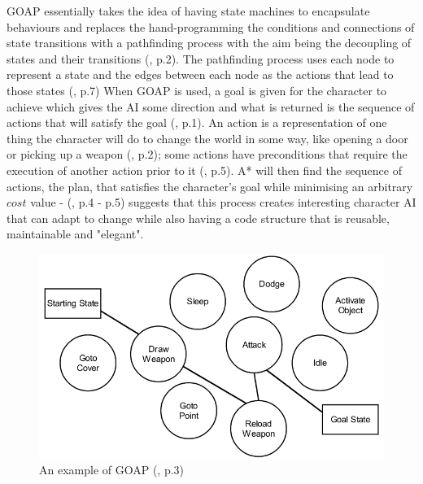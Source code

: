 \documentclass[10pt]{article}
\begin{document}
GOAP essentially takes the idea of having state machines to encapsulate behaviours and replaces the hand-programming the conditions and connections of state transitions with a pathfinding process with the aim being the decoupling of states and their transitions (\cite{orkin2003applying}, p.2). The pathfinding process uses each node to represent a state and the edges between each node as the actions that lead to those states (\cite{orkin2003applying}, p.7) When GOAP is used, a goal is given for the character to achieve which gives the AI some direction and what is returned is the sequence of actions that will satisfy the goal (\cite{orkin2003applying}, p.1). An action is a representation of one thing the character will do to change the world in some way, like opening a door or picking up a weapon (\cite{orkin2003applying}, p.2); some actions have preconditions that require the execution of another action prior to it (\cite{orkin2003applying}, p.5). A* will then find the sequence of actions, the plan, that satisfies the character's goal while minimising an arbitrary $cost$ value - \citeauthor{orkin2003applying} (\citeyear{orkin2003applying}, p.4 - p.5) suggests that this process creates interesting character AI that can adapt to change while also having a code structure that is reusable, maintainable and "elegant".

\begin{figure}[h]
  \includegraphics[width=\linewidth]{img/goap_figure_1.png}
  \caption{An example of GOAP (\cite{orkin2003applying}, p.3)}
  \label{fig:goap}
\end{figure}
\end{document}
